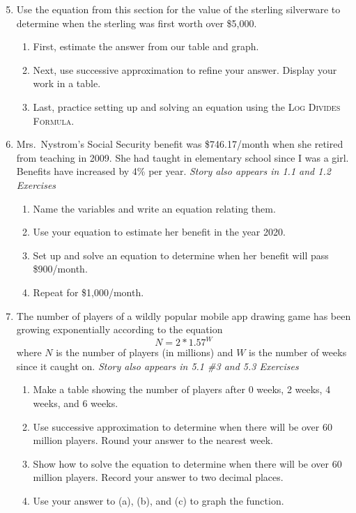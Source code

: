 \begin{enumerate} 
\setcounter{enumi}{4}

\item Use the equation from this section for the value of the sterling silverware to determine when the sterling was first worth over \$5,000.
\begin{enumerate}
\item First, estimate the answer from our table and graph.
\item Next, use successive approximation to refine your answer. Display your work in a table.
\item Last, practice setting up and solving an equation using the \textsc{Log Divides Formula}.
\end{enumerate}

\item Mrs.\ Nystrom's Social Security benefit was \$746.17/month when she retired from teaching in 2009. She had taught in elementary school since I was a girl.   Benefits have increased by 4\% per year.   \hfill \emph{Story also appears in 1.1 and 1.2  Exercises} 
\begin{enumerate}
\item Name the variables and write an equation relating them.
\item Use your equation to estimate her benefit in the year 2020.
\item Set up and solve an equation to determine when her benefit will pass \$900/month.
\item Repeat for \$1,000/month.
\end{enumerate}  

\item The number of players of a wildly popular mobile app drawing game  has been growing exponentially according to the equation $$N = 2 \ast 1.57^W$$ where $N$ is the number of players (in millions) and $W$ is the number of weeks since it caught on.
\hfill \emph{Story also appears in 5.1 \#3 and 5.3 Exercises}
\begin{enumerate}
\item Make a table showing the number of players after 0 weeks, 2 weeks, 4 weeks, and 6 weeks.  
\item Use successive approximation to determine when there will be over 60 million players.  Round your answer to the nearest week.
\item Show how to solve the equation to determine when there will be over 60 million players.  Record your answer to two decimal places.  
\item Use your answer to (a), (b), and (c) to graph the function.
\end{enumerate} 


\end{enumerate}
